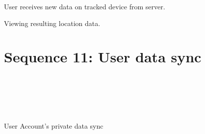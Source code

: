 \resizebox{\linewidth}{!}{}

User receives new data on tracked device from server.
\\[12pt]

\resizebox{\linewidth}{!}{}

Viewing resulting location data.
	
\section{Sequence 11: User data sync}
\resizebox{\linewidth}{!}{}
\\[12pt]

\resizebox{\linewidth}{!}{}
\\[12pt]

\resizebox{\linewidth}{!}{}
\\[12pt]

\resizebox{\linewidth}{!}{}
\\[12pt]

\resizebox{\linewidth}{!}{}

User Account's private data sync

